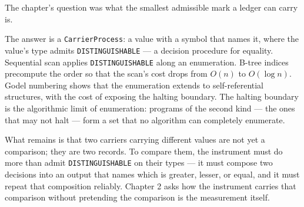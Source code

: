 \begin{bridge}

The chapter's question was what the smallest admissible mark a ledger can
carry is.

The answer is a \texttt{CarrierProcess}: a value with a symbol that names it,
where the value's type admits \texttt{DISTINGUISHABLE} --- a decision
procedure for equality. Sequential scan applies \texttt{DISTINGUISHABLE}
along an enumeration. B-tree indices precompute the order so that the
scan's cost drops from $O(n)$ to $O(\log n)$. Godel numbering shows that
the enumeration extends to self-referential structures, with the cost of
exposing the halting boundary. The halting boundary is the algorithmic
limit of enumeration: programs of the second kind --- the ones that may
not halt --- form a set that no algorithm can completely enumerate.

What remains is that two carriers carrying different values are not yet a
comparison; they are two records. To compare them, the instrument must do
more than admit \texttt{DISTINGUISHABLE} on their types --- it must
compose two decisions into an output that names which is greater, lesser,
or equal, and it must repeat that composition reliably. Chapter 2 asks
how the instrument carries that comparison without pretending the
comparison is the measurement itself.

\end{bridge}

